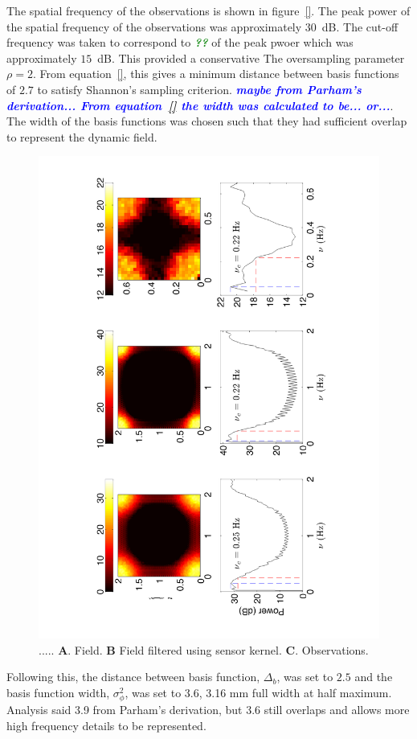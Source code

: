 \documentclass[twocolumn,11pt,a4paper]{article}		%
\newcommand{\todo}[1]{\textsf{\emph{\textbf{\textcolor{blue}{#1}}}}}
\newcommand{\omg}[1]{\textsf{\emph{\textbf{\textcolor{green}{#1}}}}}
\begin{document}
The spatial frequency of the observations is shown in figure~\ref{}. The peak power of the spatial frequency of the observations was approximately $30$~dB. The cut-off frequency was taken to correspond to \omg{??} of the peak pwoer which was approximately $15$~dB. This provided a conservative The oversampling parameter $\rho=2$. From equation~\ref{}, this gives a minimum distance between basis functions of $2.7$ to satisfy Shannon's sampling criterion. \todo{maybe from Parham's derivation... From equation~\ref{} the width was calculated to be... or...}. The width of the basis functions was chosen such that they had sufficient overlap to represent the dynamic field.

\begin{figure}
	\begin{center}
		\includegraphics[scale=0.5, angle=-90]{./Graph/FreqAnalysis.pdf}
	\end{center}
	\caption{..... \textbf{A}. Field. \textbf{B} Field filtered using sensor kernel. \textbf{C}. Observations.} \label{fig:FreqAnalysis} 
\end{figure}
Following this, the distance between basis function, $\Delta_b$, was set to $2.5$ and the basis function width, $\sigma_{\phi}^2$, was set to 3.6, 3.16 mm full width at half maximum. Analysis said 3.9 from Parham's derivation, but 3.6 still overlaps and allows more high frequency details to be represented.
\end{document}
